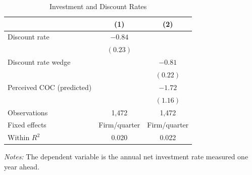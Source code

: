 \begin{table}[htbp]
    \centering
    \caption{Investment and Discount Rates}
    \label{tab:investment_discount_rates}
    \begin{tabular}{lcc}
        \toprule
        & (1) & (2) \\
        \midrule
        Discount rate
            & $-0.84$ & \\
            & $(0.23)$ & \\[0.3em]

        Discount rate wedge
            & & $-0.81$ \\
            & & $(0.22)$ \\[0.3em]

        Perceived COC (predicted)
            & & $-1.72$ \\
            & & $(1.16)$ \\
        \midrule
        Observations
            & 1,472 & 1,472 \\
        Fixed effects
            & Firm/quarter & Firm/quarter \\
        Within $R^2$
            & 0.020 & 0.022 \\
        \bottomrule
    \end{tabular}

    \begin{minipage}{0.85\linewidth}
        \footnotesize
        \vspace{0.5em}
        \textit{Notes:} The dependent variable is the annual net investment
        rate measured one year ahead.
    \end{minipage}
\end{table}